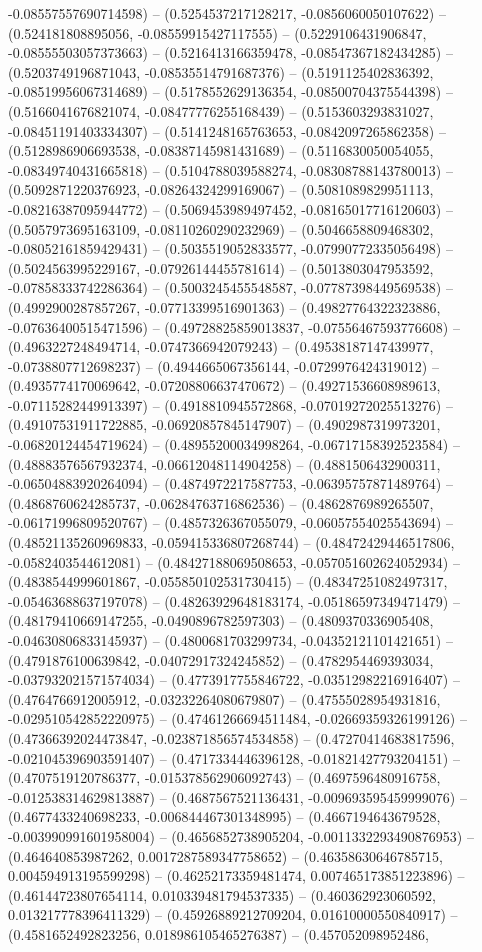 -0.08557557690714598) -- (0.5254537217128217, -0.0856060050107622) -- (0.524181808895056, -0.08559915427117555) -- (0.5229106431906847, -0.08555503057373663) -- (0.5216413166359478, -0.08547367182434285) -- (0.5203749196871043, -0.08535514791687376) -- (0.5191125402836392, -0.08519956067314689) -- (0.5178552629136354, -0.08500704375544398) -- (0.5166041676821074, -0.08477776255168439) -- (0.5153603293831027, -0.08451191403334307) -- (0.5141248165763653, -0.0842097265862358) -- (0.5128986906693538, -0.08387145981431689) -- (0.5116830050054055, -0.08349740431665818) -- (0.5104788039588274, -0.08308788143780013) -- (0.5092871220376923, -0.08264324299169067) -- (0.5081089829951113, -0.08216387095944772) -- (0.5069453989497452, -0.08165017716120603) -- (0.5057973695163109, -0.08110260290232969) -- (0.5046658809468302, -0.08052161859429431) -- (0.5035519052833577, -0.07990772335056498) -- (0.5024563995229167, -0.07926144455781614) -- (0.5013803047953592, -0.07858333742286364) -- (0.5003245455548587, -0.07787398449569538) -- (0.4992900287857267, -0.07713399516901363) -- (0.49827764322323886, -0.07636400515471596) -- (0.49728825859013837, -0.07556467593776608) -- (0.4963227248494714, -0.0747366942079243) -- (0.49538187147439977, -0.0738807712698237) -- (0.4944665067356144, -0.0729976424319012) -- (0.4935774170069642, -0.07208806637470672) -- (0.49271536608989613, -0.07115282449913397) -- (0.4918810945572868, -0.07019272025513276) -- (0.49107531911722885, -0.06920857845147907) -- (0.4902987319973201, -0.06820124454719624) -- (0.48955200034998264, -0.06717158392523584) -- (0.48883576567932374, -0.06612048114904258) -- (0.4881506432900311, -0.06504883920264094) -- (0.4874972217587753, -0.06395757871489764) -- (0.4868760624285737, -0.06284763716862536) -- (0.4862876989265507, -0.06171996809520767) -- (0.4857326367055079, -0.06057554025543694) -- (0.48521135260969833, -0.059415336807268744) -- (0.48472429446517806, -0.0582403544612081) -- (0.48427188069508653, -0.057051602624052934) -- (0.4838544999601867, -0.055850102531730415) -- (0.48347251082497317, -0.05463688637197078) -- (0.48263929648183174, -0.05186597349471479) -- (0.48179410669147255, -0.0490896782597303) -- (0.4809370336905408, -0.04630806833145937) -- (0.4800681703299734, -0.04352121101421651) -- (0.4791876100639842, -0.04072917324245852) -- (0.4782954469393034, -0.037932021571574034) -- (0.4773917755846722, -0.03512982216916407) -- (0.4764766912005912, -0.03232264080679807) -- (0.47555028954931816, -0.029510542852220975) -- (0.47461266694511484, -0.02669359326199126) -- (0.47366392024473847, -0.023871856574534858) -- (0.47270414683817596, -0.021045396903591407) -- (0.4717334446396128, -0.01821427793204151) -- (0.4707519120786377, -0.015378562906092743) -- (0.4697596480916758, -0.012538314629813887) -- (0.4687567521136431, -0.009693595459999076) -- (0.4677433240698233, -0.006844467301348995) -- (0.4667194643679528, -0.003990991601958004) -- (0.4656852738905204, -0.0011332293490876953) -- (0.464640853987262, 0.0017287589347758652) -- (0.46358630646785715, 0.004594913195599298) -- (0.46252173359481474, 0.007465173851223896) -- (0.46144723807654114, 0.010339481794537335) -- (0.460362923060592, 0.013217778396411329) -- (0.45926889212709204, 0.01610000550840917) -- (0.4581652492823256, 0.018986105465276387) -- (0.457052098952486, 